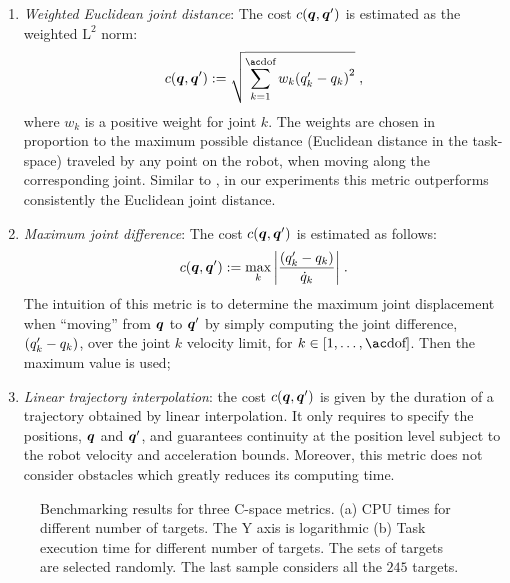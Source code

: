 \begin{enumerate}

  \item \textit{Weighted Euclidean joint distance}: The cost $c\qty(\vb*{q},
  \vb*{q}')$ is estimated as the weighted $\mbox{L}^{2}$ norm:
  \begin{equation*}
    c\qty(\vb*{q}, \vb*{q}') :=
    \sqrt{\sum_{k=1}^{\mdof}w_{k}\qty(q'_{k}-q_{k})^2}\; ,
  \end{equation*}
  where $w_{k}$ is a positive weight for joint $k$. The weights are chosen in
  proportion to the maximum possible distance (Euclidean distance in the
  task-space) traveled by any point on the robot, when moving along the
  corresponding joint. Similar to \cite{Bohlin2000}, in our experiments this
  metric outperforms consistently the Euclidean joint distance.

  \item \textit{Maximum joint difference}: The cost $c\qty(\vb*{q}, \vb*{q}')$
  is estimated as follows:
  \begin{equation*}
    c\qty(\vb*{q}, \vb*{q}') :=
          \max_{k}\abs{\frac{\qty(q'_{k}-q_{k})}{\dot{q}_k}}\; .
  \end{equation*}
  The intuition of this metric is to determine the maximum joint displacement
  when \enquote{moving} from $\vb*{q}$ to $\vb*{q}'$ by simply computing the
  joint difference, $\qty(q'_{k}-q_{k})$, over the joint $k$ velocity limit, for
  $k \in \qty[1,\dots,\mdof]$. Then the maximum value is used;

  \item \textit{Linear trajectory interpolation}: the cost $c\qty(\vb*{q},
  \vb*{q}')$ is given by the duration of a trajectory obtained by linear
  interpolation. It only requires to specify the positions, $\vb*{q}$ and
  $\vb*{q}'$, and guarantees continuity at the position level subject to the
  robot velocity and acceleration bounds. Moreover, this metric does not
  consider obstacles which greatly reduces its computing time.

\end{enumerate}

\begin{figure}[t]
  \centering
  \vspace*{2mm}
  \;
  \caption{Benchmarking results for three C-space metrics. (a) CPU times for
  different number of targets. The Y axis is logarithmic (b) Task execution time
  for different number of targets. The sets of targets are selected randomly.
  The last sample considers all the $245$ targets.}
  \label{fig:metrics_benchmark}
\end{figure}

